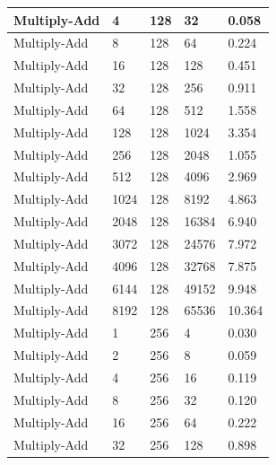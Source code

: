 \documentclass{article}
\begin{document}
\begin{longtable}{|l|l|l|l|l|}
Multiply-Add       & 4    & 128         & 32                & 0.058             \\ \hline
Multiply-Add       & 8    & 128         & 64                & 0.224             \\ \hline
Multiply-Add       & 16   & 128         & 128               & 0.451             \\ \hline
Multiply-Add       & 32   & 128         & 256               & 0.911             \\ \hline
Multiply-Add       & 64   & 128         & 512               & 1.558             \\ \hline
Multiply-Add       & 128  & 128         & 1024              & 3.354             \\ \hline
Multiply-Add       & 256  & 128         & 2048              & 1.055             \\ \hline
Multiply-Add       & 512  & 128         & 4096              & 2.969             \\ \hline
Multiply-Add       & 1024 & 128         & 8192              & 4.863             \\ \hline
Multiply-Add       & 2048 & 128         & 16384             & 6.940             \\ \hline
Multiply-Add       & 3072 & 128         & 24576             & 7.972             \\ \hline
Multiply-Add       & 4096 & 128         & 32768             & 7.875             \\ \hline
Multiply-Add       & 6144 & 128         & 49152             & 9.948             \\ \hline
Multiply-Add       & 8192 & 128         & 65536             & 10.364            \\ \hline
Multiply-Add       & 1    & 256         & 4                 & 0.030             \\ \hline
Multiply-Add       & 2    & 256         & 8                 & 0.059             \\ \hline
Multiply-Add       & 4    & 256         & 16                & 0.119             \\ \hline
Multiply-Add       & 8    & 256         & 32                & 0.120             \\ \hline
Multiply-Add       & 16   & 256         & 64                & 0.222             \\ \hline
Multiply-Add       & 32   & 256         & 128               & 0.898             \\ \hline

\end{longtable}
\end{document}
